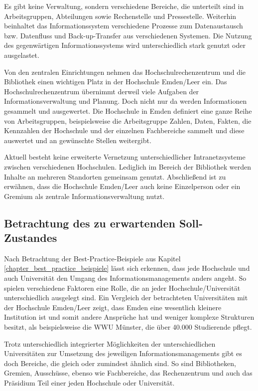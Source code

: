 Es gibt keine Verwaltung, sondern verschiedene Bereiche, die unterteilt sind in Arbeitsgruppen, Abteilungen sowie Rechenstelle und Pressestelle. Weiterhin beinhaltet das Informationssystem verschiedene Prozesse zum Datenaustausch bzw. Datenfluss und Back-up-Transfer aus verschiedenen Systemen.  Die Nutzung des gegenwärtigen Informationssystems wird unterschiedlich stark genutzt oder ausgelastet. 

Von den zentralen Einrichtungen nehmen das Hochschulrechenzentrum und die Bibliothek einen wichtigen Platz in der Hochschule Emden/Leer ein. Das Hochschulrechenzentrum übernimmt derweil viele Aufgaben der Informationsverwaltung und Planung. Doch nicht nur da werden Informationen gesammelt und ausgewertet. Die Hochschule in Emden definiert eine ganze Reihe von Arbeitsgruppen, beispielsweise die Arbeitsgruppe Zahlen, Daten, Fakten, die Kennzahlen der Hochschule und der einzelnen Fachbereiche sammelt und diese auswertet und an gewünschte Stellen weitergibt.  

Aktuell besteht keine erweiterte Vernetzung unterschiedlicher Intranetzsysteme zwischen verschiedenen Hochschulen. Lediglich im Bereich der Bibliothek werden Inhalte an mehreren Standorten gemeinsam genutzt. Abschließend ist zu erwähnen, dass die Hochschule Emden/Leer auch keine Einzelperson oder ein Gremium als zentrale Informationsverwaltung nutzt.


\subsection{Betrachtung des zu erwartenden Soll-Zustandes }
\label{subsection_betrachtung_soll}

Nach Betrachtung der Best-Practice-Beispiele aus Kapitel \ref{chapter_best_practice_beispiele} lässt sich erkennen, dass jede Hochschule und auch Universität den Umgang des Informationsmanagements anders angeht. So spielen verschiedene Faktoren eine Rolle, die an jeder Hochschule/Universität unterschiedlich ausgelegt sind. Ein Vergleich der betrachteten Universitäten mit der Hochschule Emden/Leer zeigt, dass Emden eine wesentlich kleinere Institution ist und somit andere Ansprüche hat und weniger komplexe Strukturen besitzt, als beispielsweise die WWU Münster, die über 40.000 Studierende pflegt. 

Trotz unterschiedlich integrierter Möglichkeiten der unterschiedlichen Universitäten zur Umsetzung des jeweiligen Informationsmanagements gibt es doch Bereiche, die gleich oder zumindest ähnlich sind. So sind Bibliotheken, Gremien, Ausschüsse, ebenso wie Fachbereiche, das Rechenzentrum und auch das Präsidium Teil einer jeden Hochschule oder Universität. 

